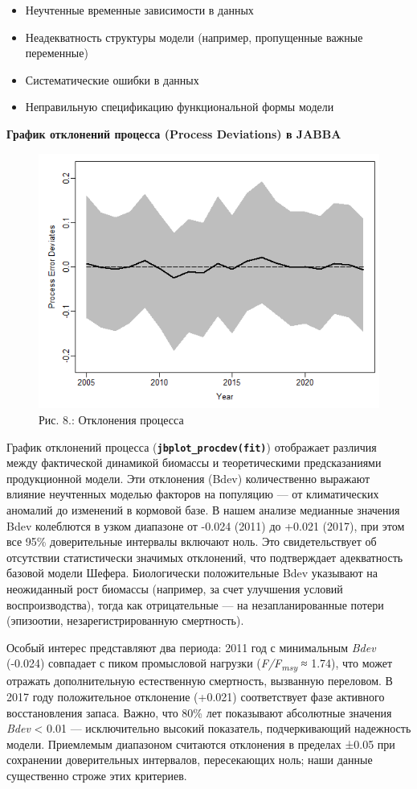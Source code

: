 \documentclass[
  letterpaper,
  DIV=11,
  numbers=noendperiod]{scrreprt}
\begin{document}
\begin{itemize}
\item
  Неучтенные временные зависимости в данных
\item
  Неадекватность структуры модели (например, пропущенные важные
  переменные)
\item
  Систематические ошибки в данных
\item
  Неправильную спецификацию функциональной формы модели
\end{itemize}

\textbf{График отклонений процесса (Process Deviations) в JABBA}

\begin{figure}[H]

{\centering \includegraphics[width=0.6\linewidth,height=\textheight,keepaspectratio]{images/JABBA8.png}

}

\caption{Рис. 8.: Отклонения процесса}

\end{figure}%

График отклонений процесса (\textbf{\texttt{jbplot\_procdev(fit)}})
отображает различия между фактической динамикой биомассы и
теоретическими предсказаниями продукционной модели. Эти отклонения
(Bdev) количественно выражают влияние неучтенных моделью факторов на
популяцию --- от климатических аномалий до изменений в кормовой базе. В
нашем анализе медианные значения Bdev колеблются в узком диапазоне от
-0.024 (2011) до +0.021 (2017), при этом все 95\% доверительные
интервалы включают ноль. Это свидетельствует об отсутствии статистически
значимых отклонений, что подтверждает адекватность базовой модели
Шефера. Биологически положительные Bdev указывают на неожиданный рост
биомассы (например, за счет улучшения условий воспроизводства), тогда
как отрицательные --- на незапланированные потери (эпизоотии,
незарегистрированную смертность).

Особый интерес представляют два периода: 2011 год с минимальным
\emph{Bdev} (-0.024) совпадает с пиком промысловой нагрузки
(\emph{F/F\textsubscript{msy}} ≈ 1.74), что может отражать
дополнительную естественную смертность, вызванную переловом. В 2017 году
положительное отклонение (+0.021) соответствует фазе активного
восстановления запаса. Важно, что 80\% лет показывают абсолютные
значения \emph{Bdev} \textless{} 0.01 --- исключительно высокий
показатель, подчеркивающий надежность модели. Приемлемым диапазоном
считаются отклонения в пределах ±0.05 при сохранении доверительных
интервалов, пересекающих ноль; наши данные существенно строже этих
критериев.
\end{document}
